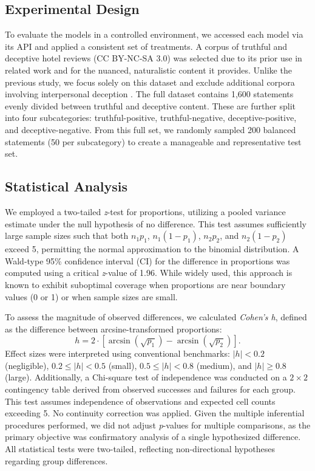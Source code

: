 \documentclass{article}
\begin{document}
\subsection{Experimental Design}

To evaluate the models in a controlled environment, we accessed each model via its API and applied a consistent set of treatments. A corpus of truthful and deceptive hotel reviews \citep{ott_finding_2011} (CC BY-NC-SA 3.0) was selected due to its prior use in related work \citep{markowitz_generative_2024} and for the nuanced, naturalistic content it provides. Unlike the previous study, we focus solely on this dataset and exclude additional corpora involving interpersonal deception \citep{markowitz_when_2020, lloyd_miami_2019}. The full dataset contains 1,600 statements evenly divided between truthful and deceptive content. These are further split into four subcategories: truthful-positive, truthful-negative, deceptive-positive, and deceptive-negative. From this full set, we randomly sampled 200 balanced statements (50 per subcategory) to create a manageable and representative test set.

\subsection{Statistical Analysis}

We employed a two-tailed \textit{z}-test for proportions, utilizing a pooled variance estimate under the null hypothesis of no difference. This test assumes sufficiently large sample sizes such that both $n_1p_1$, $n_1(1-p_1)$, $n_2p_2$, and $n_2(1-p_2)$ exceed 5, permitting the normal approximation to the binomial distribution. A Wald-type 95\% confidence interval (CI) for the difference in proportions was computed using a critical \textit{z}-value of 1.96. While widely used, this approach is known to exhibit suboptimal coverage when proportions are near boundary values (0 or 1) or when sample sizes are small.

To assess the magnitude of observed differences, we calculated \textit{Cohen's h}, defined as the difference between arcsine-transformed proportions: 
\[
h = 2 \cdot \left[ \arcsin\left(\sqrt{p_1}\right) - \arcsin\left(\sqrt{p_2}\right) \right].
\]
Effect sizes were interpreted using conventional benchmarks: $|h| < 0.2$ (negligible), $0.2 \leq |h| < 0.5$ (small), $0.5 \leq |h| < 0.8$ (medium), and $|h| \geq 0.8$ (large). Additionally, a Chi-square test of independence was conducted on a $2 \times 2$ contingency table derived from observed successes and failures for each group. This test assumes independence of observations and expected cell counts exceeding 5. No continuity correction was applied. Given the multiple inferential procedures performed, we did not adjust \textit{p}-values for multiple comparisons, as the primary objective was confirmatory analysis of a single hypothesized difference. All statistical tests were two-tailed, reflecting non-directional hypotheses regarding group differences.
\end{document}
